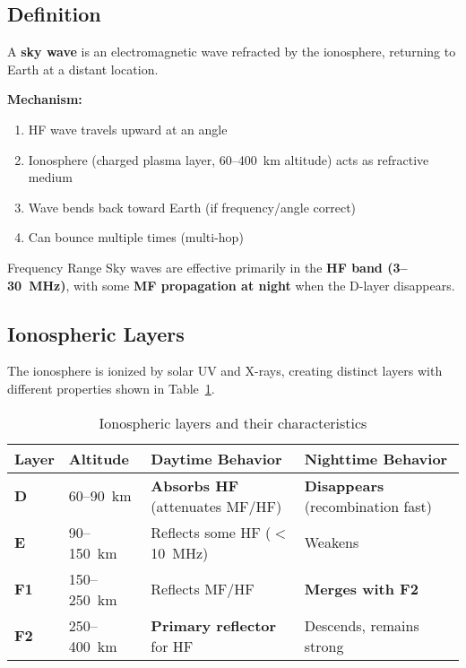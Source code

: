 \subsection{Definition}

A \textbf{sky wave} is an electromagnetic wave refracted by the ionosphere, returning to Earth at a distant location.

\textbf{Mechanism:}
\begin{enumerate}
\item HF wave travels upward at an angle
\item Ionosphere (charged plasma layer, 60--400~km altitude) acts as refractive medium
\item Wave bends back toward Earth (if frequency/angle correct)
\item Can bounce multiple times (multi-hop)
\end{enumerate}

\begin{calloutbox}{Frequency Range}
Sky waves are effective primarily in the \textbf{HF band (3--30~MHz)}, with some \textbf{MF propagation at night} when the D-layer disappears.
\end{calloutbox}

\subsection{Ionospheric Layers}

The ionosphere is ionized by solar UV and X-rays, creating distinct layers with different properties shown in Table~\ref{tab:ionospheric-layers}.

\begin{table}[htbp]
\centering
\caption{Ionospheric layers and their characteristics}
\label{tab:ionospheric-layers}
\small
\begin{tabular}{@{}llp{3.5cm}p{3.5cm}@{}}
\toprule
\textbf{Layer} & \textbf{Altitude} & \textbf{Daytime Behavior} & \textbf{Nighttime Behavior} \\
\midrule
\textbf{D} & 60--90~km & \textbf{Absorbs HF} (attenuates MF/HF) & \textbf{Disappears} (recombination fast) \\
\textbf{E} & 90--150~km & Reflects some HF ($<$10~MHz) & Weakens \\
\textbf{F1} & 150--250~km & Reflects MF/HF & \textbf{Merges with F2} \\
\textbf{F2} & 250--400~km & \textbf{Primary reflector} for HF & Descends, remains strong \\
\bottomrule
\end{tabular}
\end{table}

